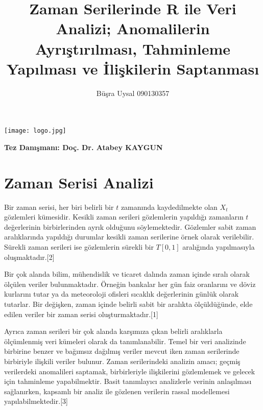 \documentclass[11pt]{article}
\title{Zaman Serilerinde R ile Veri Analizi; Anomalilerin Ayrıştırılması, Tahminleme Yapılması ve İlişkilerin Saptanması}
\makeatletter
\def\maxwidth{\ifdim\Gin@nat@width>\linewidth\linewidth
    \else\Gin@nat@width\fi}
\let\Oldincludegraphics\includegraphics
\renewcommand{\includegraphics}[1]{\Oldincludegraphics[width=.8\maxwidth]{#1}}
\makeatother
\begin{document}
       \maketitle

\begin{center}
  \author{Büşra Uysal 090130357}

\end{center}
    

  
    \begin{center}
    \texttt{[image: logo.jpg]}
    \end{center}






\begin{center}
\textbf{Tez Danışmanı: Doç. Dr. Atabey KAYGUN}
\end{center}
        \pagebreak
\tableofcontents
\pagebreak

    

    
    \section{Zaman Serisi Analizi}\label{zaman-serisi-analizi}

Bir zaman serisi, her biri belirli bir \(t\) zamanında kaydedilmekte
olan \(X_t\) gözlemleri kümesidir. Kesikli zaman serileri gözlemlerin
yapıldığı zamanların \(t\) değerlerinin birbirlerinden ayrık olduğunu
söylemektedir. Gözlemler sabit zaman aralıklarında yapıldığı durumlar
kesikli zaman serilerine örnek olarak verilebilir. Sürekli zaman
serileri ise gözlemlerin sürekli bir \(T[0,1]\) aralığında yapılmasıyla
oluşmaktadır.{[}2{]}

Bir çok alanda bilim, mühendislik ve ticaret dalında zaman içinde sıralı
olarak ölçülen veriler bulunmaktadır. Örneğin bankalar her gün faiz
oranlarını ve döviz kurlarını tutar ya da meteoroloji ofisleri sıcaklık
değerlerinin günlük olarak tutarlar. Bir değişken, zaman içinde belirli
sabit bir aralıkta ölçüldüğünde, elde edilen veriler bir zaman serisi
oluşturmaktadır.{[}1{]}

Ayrıca zaman serileri bir çok alanda karşımıza çıkan belirli aralıklarla
ölçümlenmiş veri kümeleri olarak da tanımlanabilir. Temel bir veri
analizinde birbirine benzer ve bağımsız dağılmış veriler mevcut iken
zaman serilerinde birbiriyle ilişkili veriler bulunur. Zaman
serilerindeki analizin amacı; geçmiş verilerdeki anomalileri saptamak,
birbirleriyle ilişkilerini gözlemlemek ve gelecek için tahminleme
yapabilmektir. Basit tanımlayıcı analizlerle verinin anlaşılması
sağlanırken, kapsamlı bir analiz ile gözlenen verilerin rassal
modellemesi yapılabilmektedir.{[}3{]}
\end{document}
